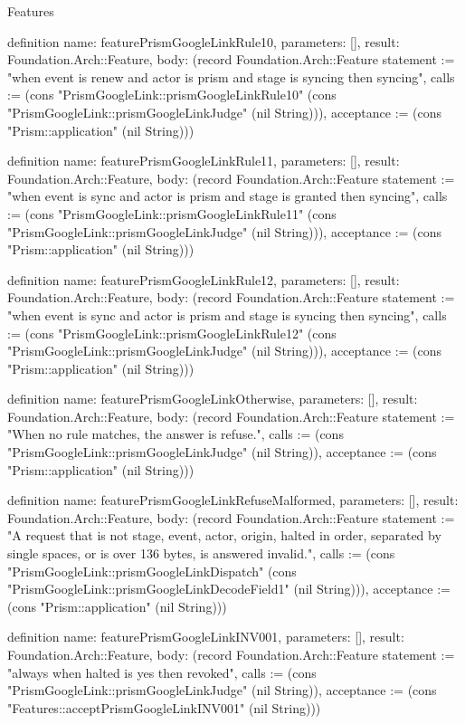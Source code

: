 \begin{lexlean}{Features}
\begin{semanticmodule}
definition{
  name: featurePrismGoogleLinkRule10,
  parameters: [],
  result: Foundation.Arch::Feature,
  body: (record Foundation.Arch::Feature {statement := "when event is renew and actor is prism and stage is syncing then syncing", calls := (cons "PrismGoogleLink::prismGoogleLinkRule10" (cons "PrismGoogleLink::prismGoogleLinkJudge" (nil String))), acceptance := (cons "Prism::application" (nil String))})
}

definition{
  name: featurePrismGoogleLinkRule11,
  parameters: [],
  result: Foundation.Arch::Feature,
  body: (record Foundation.Arch::Feature {statement := "when event is sync and actor is prism and stage is granted then syncing", calls := (cons "PrismGoogleLink::prismGoogleLinkRule11" (cons "PrismGoogleLink::prismGoogleLinkJudge" (nil String))), acceptance := (cons "Prism::application" (nil String))})
}

definition{
  name: featurePrismGoogleLinkRule12,
  parameters: [],
  result: Foundation.Arch::Feature,
  body: (record Foundation.Arch::Feature {statement := "when event is sync and actor is prism and stage is syncing then syncing", calls := (cons "PrismGoogleLink::prismGoogleLinkRule12" (cons "PrismGoogleLink::prismGoogleLinkJudge" (nil String))), acceptance := (cons "Prism::application" (nil String))})
}

definition{
  name: featurePrismGoogleLinkOtherwise,
  parameters: [],
  result: Foundation.Arch::Feature,
  body: (record Foundation.Arch::Feature {statement := "When no rule matches, the answer is refuse.", calls := (cons "PrismGoogleLink::prismGoogleLinkJudge" (nil String)), acceptance := (cons "Prism::application" (nil String))})
}

definition{
  name: featurePrismGoogleLinkRefuseMalformed,
  parameters: [],
  result: Foundation.Arch::Feature,
  body: (record Foundation.Arch::Feature {statement := "A request that is not stage, event, actor, origin, halted in order, separated by single spaces, or is over 136 bytes, is answered invalid.", calls := (cons "PrismGoogleLink::prismGoogleLinkDispatch" (cons "PrismGoogleLink::prismGoogleLinkDecodeField1" (nil String))), acceptance := (cons "Prism::application" (nil String))})
}

definition{
  name: featurePrismGoogleLinkINV001,
  parameters: [],
  result: Foundation.Arch::Feature,
  body: (record Foundation.Arch::Feature {statement := "always when halted is yes then revoked", calls := (cons "PrismGoogleLink::prismGoogleLinkJudge" (nil String)), acceptance := (cons "Features::acceptPrismGoogleLinkINV001" (nil String))})
}


\end{semanticmodule}
\end{lexlean}
